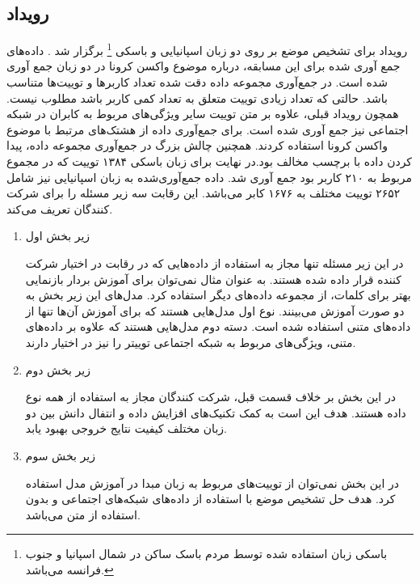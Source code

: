 \subsection{رویداد
	}

رویداد 
\href{https://vaxxstance.github.io/}{}
برای تشخیص موضع بر روی دو زبان اسپانیایی و باسکی
\footnote{
باسکی زبان استفاده شده توسط مردم باسک ساکن در شمال اسپانیا و جنوب فرانسه می‌باشد. 
}
 برگزار شد \cite{agerri2021vaxxstance}.  دادە‌های جمع آوری شده برای این مسابقه، درباره موضوع واکسن کرونا در دو زبان جمع آوری شده است. در جمع‌آوری مجموعه داده دقت شده تعداد کاربرها و توییت‌ها متناسب باشد. حالتی که تعداد زیادی توییت متعلق به تعداد کمی کاربر باشد مطلوب نیست. همچون رویداد قبلی، علاوه بر متن توییت سایر ویژگی‌های مربوط به کابران در شبکه اجتماعی نیز جمع آوری شده است. برای جمع‌آوری داده از هشتک‌های مرتبط با موضوع واکسن کرونا استفاده کردند. همچنین چالش بزرگ در جمع‌آوری مجموعه داده، پیدا کردن داده با برچسب مخالف بود.در نهایت برای زبان باسکی ۱۳۸۴ توییت که در مجموع مربوط به ۲۱۰ کاربر بود جمع آوری شد. داده جمع‌آوری‌شده به زبان اسپانیایی نیز شامل ۲۶۵۲ توییت مختلف به ۱۶۷۶ کابر می‌باشد. این رقابت سه زیر مسئله را برای شرکت کنندگان تعریف می‌کند.
 
 \begin{enumerate}
 	\item زیر بخش اول
 	
 	در این زیر مسئله تنها مجاز به استفادە از دادە‌هایی که در رقابت در اختیار شرکت کننده قرار داده شده هستند. به عنوان مثال نمی‌توان برای آموزش بردار بازنمایی بهتر برای کلمات، از مجموعه دادە‌های	دیگر استفاده کرد. مدل‌های این زیر بخش به دو صورت آموزش می‌‌بینند. نوع اول مدل‌هایی هستند 	که برای آموزش آن‌ها تنها از دادە‌های متنی استفاده شده است. دسته دوم مدل‌هایی هستند که علاوه 	بر دادە‌های متنی، ویژگی‌های مربوط به شبکه اجتماعی توییتر را نیز در اختیار دارند.
 	\item زیر بخش دوم
 	
 	در این بخش بر خلاف قسمت قبل، شرکت کنندگان مجاز به استفاده از همه نوع داده هستند. هدف این است به کمک تکنیک‌های افزایش داده 
 	و انتفال دانش بین دو زبان مختلف کیفیت نتایج خروجی بهبود یابد.
 	\item زیر بخش سوم
 	
 	در این بخش نمی‌توان از توییت‌های مربوط به زبان مبدا در آموزش مدل استفاده کرد. هدف حل تشخیص موضع با استفاده از دادە‌های شبکەهای اجتماعی و بدون استفاده از متن می‌باشد.
 \end{enumerate}
 
